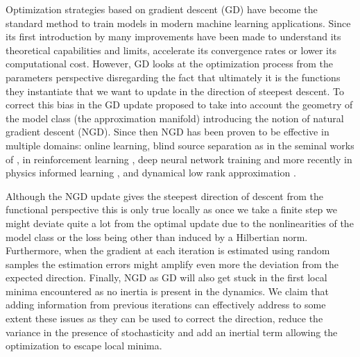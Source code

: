 \documentclass{article}
\theoremstyle{noparens}
\begin{document}
Optimization strategies based on gradient descent (GD) have become the standard method to train models in modern machine learning applications. Since its first introduction by \cite{cauchyMethodeGeneralePour1847} many improvements have been made to understand its theoretical capabilities and limits, accelerate its convergence rates or lower its computational cost. However, GD looks at the optimization process from the parameters perspective disregarding the fact that ultimately it is the functions they instantiate that we want to update in the direction of steepest descent. To correct this  bias in the GD update \cite{amariNeuralLearningStructured1996,amariNaturalGradientWorks1998} proposed to take into account the geometry of the model class (the approximation manifold) introducing the notion of natural gradient descent (NGD). Since then NGD has been proven to be effective in multiple domains: online learning, blind source separation as in the seminal works of \cite{amariNeuralLearningStructured1996,amariNaturalGradientWorks1998}, in reinforcement learning \cite{petersNaturalActorCritic2008}, deep neural network training \cite{parkAdaptiveNaturalGradient2000,martensOptimizingNeuralNetworks2020} and more recently in physics informed learning \cite{müllerAchievingHighAccuracy2023,schwenckeANaGRAMNaturalGradient2024,jniniGaussNewtonNaturalGradient2024}, and  dynamical low rank approximation \cite{bonStableNonlinearDynamical2025a}.

Although the NGD update gives the steepest direction of descent from the functional perspective this is only true locally as once we take a finite step we might deviate quite a lot from the optimal update due to the nonlinearities of the model class or the loss being other than induced by a Hilbertian norm. Furthermore, when the gradient at each iteration is estimated using random samples the estimation errors might amplify even more the deviation from the expected direction. Finally, NGD as GD will also get stuck in the first local minima encountered as no inertia is present in the dynamics. We claim that adding information from previous iterations can effectively address to some extent these issues as they can be used to correct the direction, reduce the variance in the presence of stochasticity and add an inertial term allowing the optimization to escape local minima.
\end{document}
